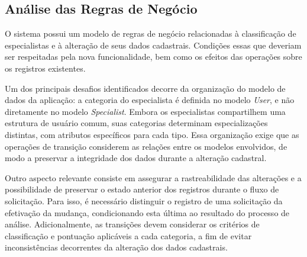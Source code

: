 \subsection{Análise das Regras de Negócio}
\label{sec:regras-negocio}
O sistema possui um modelo de regras de negócio relacionadas à classificação de especialistas 
e à alteração de seus dados cadastrais. Condições essas que deveriam ser respeitadas pela nova 
funcionalidade, bem como os efeitos das operações sobre os registros existentes.

Um dos principais desafios identificados decorre da organização do modelo de dados da 
aplicação: a categoria do especialista é definida no modelo \textit{User}, e não diretamente 
no modelo \textit{Specialist}. Embora os especialistas compartilhem uma estrutura de usuário 
comum, suas categorias determinam especializações distintas, com atributos específicos para 
cada tipo. Essa organização exige que as operações de transição considerem as relações entre 
os modelos envolvidos, de modo a preservar a integridade dos dados durante a alteração cadastral.


Outro aspecto relevante consiste em assegurar a rastreabilidade das alterações e a possibilidade 
de preservar o estado anterior dos registros durante o fluxo de solicitação. Para isso, é 
necessário distinguir o registro de uma solicitação da efetivação da mudança, condicionando 
esta última ao resultado do processo de análise. Adicionalmente, as transições devem considerar 
os critérios de classificação e pontuação aplicáveis a cada categoria, a fim de evitar 
inconsistências decorrentes da alteração dos dados cadastrais.